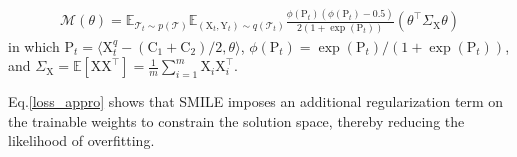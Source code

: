 \begin{equation}
\label{m_theta}
\begin{aligned}
    \mathcal{M}(\theta)\!=\!\mathbb E_{\mathcal{T}_t\sim p(\mathcal{T})}\mathbb E_{(\mathrm{X}_t,\mathrm{Y}_t)\sim q(\mathcal{T}_t)} \frac{\phi(\mathrm{P}_t)(\phi(\mathrm{P}_t)\!-\!0.5)}{2(1\!+\!\exp{(\mathrm{P}_t)})}(\theta^\top\Sigma_\mathrm{X}\theta)
\end{aligned}
\end{equation}
in which $\mathrm
P_t\!=\!\langle\mathrm{X}_t^q \! - \! (\mathrm{C}_1 \! + \! \mathrm{C}_2)/2,\theta\rangle$, $\phi(\mathrm{P}_t)\!=\!\exp(\mathrm{P}_t)/(1\!+\!\exp(\mathrm{P}_t))$, and $\Sigma_\mathrm{X}\!=\!\mathbb E[\mathrm{X}\mathrm{X}^\top]\!=\!\frac{1}{m}\sum\nolimits_{i=1}^m\mathrm{X}_i\mathrm{X}_i^\top$. %

Eq.\ref{loss_appro} shows that SMILE imposes an additional regularization term on the trainable weights to constrain the solution space, thereby reducing the likelihood of overfitting.


